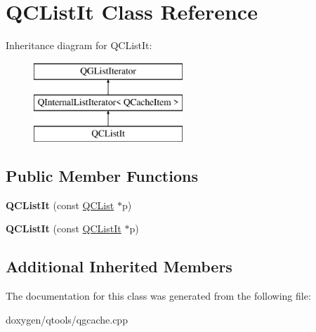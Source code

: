 \hypertarget{class_q_c_list_it}{}\section{Q\+C\+List\+It Class Reference}
\label{class_q_c_list_it}
Inheritance diagram for Q\+C\+List\+It\+:\begin{figure}[H]
\begin{center}
\leavevmode
\includegraphics[height=3.000000cm]{class_q_c_list_it}
\end{center}
\end{figure}
\subsection*{Public Member Functions}
\begin{DoxyCompactItemize}
\item 
\mbox{\label{class_q_c_list_it_a253c46261e69121a3228d091803c9481}} 
{\bfseries Q\+C\+List\+It} (const \mbox{\hyperlink{class_q_c_list}{Q\+C\+List}} $\ast$p)
\item 
\mbox{\label{class_q_c_list_it_ac320e8d9e536b2c77db2900bf1133232}} 
{\bfseries Q\+C\+List\+It} (const \mbox{\hyperlink{class_q_c_list_it}{Q\+C\+List\+It}} $\ast$p)
\end{DoxyCompactItemize}
\subsection*{Additional Inherited Members}


The documentation for this class was generated from the following file\+:\begin{DoxyCompactItemize}
\item 
doxygen/qtools/qgcache.\+cpp\end{DoxyCompactItemize}
